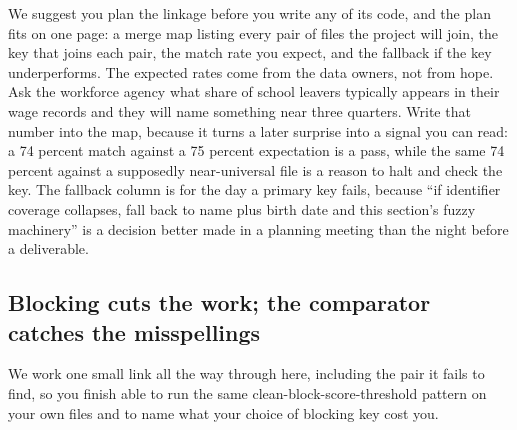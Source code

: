 We suggest you plan the linkage before you write any of its code, and the plan fits on one page: a merge map listing every pair of files the project will join, the key that joins each pair, the match rate you expect, and the fallback if the key underperforms. The expected rates come from the data owners, not from hope. Ask the workforce agency what share of school leavers typically appears in their wage records and they will name something near three quarters. Write that number into the map, because it turns a later surprise into a signal you can read: a 74 percent match against a 75 percent expectation is a pass, while the same 74 percent against a supposedly near-universal file is a reason to halt and check the key. The fallback column is for the day a primary key fails, because \enquote{if identifier coverage collapses, fall back to name plus birth date and this section's fuzzy machinery} is a decision better made in a planning meeting than the night before a deliverable.

\subsection{Blocking cuts the work; the comparator catches the misspellings}\label{sec:ch06-blocking}
We work one small link all the way through here, including the pair it fails to find, so you finish able to run the same clean-block-score-threshold pattern on your own files and to name what your choice of blocking key cost you.

